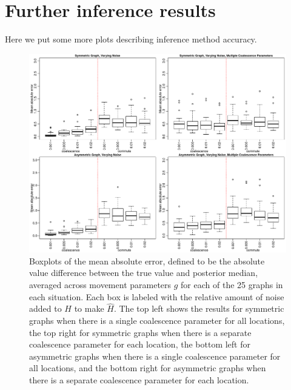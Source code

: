 \documentclass{article}
\begin{document}
\section{Further inference results}

Here we put some more plots describing inference method accuracy.


\begin{figure}
\centering
\includegraphics[scale=.6]{figs/mult_noise}
\caption{Boxplots of the mean absolute error, %
defined to be the absolute value difference between the true value and posterior median,
averaged across movement parameters $g$ for each of the 25 graphs in each situation.
Each box is labeled with the relative amount of noise added to $H$ to make $\hat{H}$.
The top left shows the results for symmetric graphs 
when there is a single coalescence parameter for all locations,
the top right for symmetric graphs 
when there is a separate coalescence parameter for each location,
the bottom left for asymmetric graphs 
when there is a single coalescence parameter for all locations,
and the bottom right for asymmetric graphs 
when there is a separate coalescence parameter for each location.}
\label{fig:mult_noise}
\end{figure}
\end{document}
